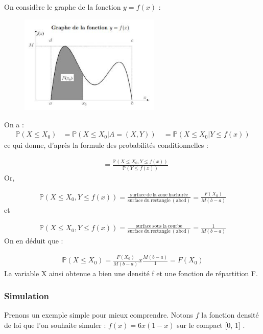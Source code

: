 \documentclass[10pt]{article} %
\begin{document}
On considère le graphe de la fonction $y = f(x)$ :

\begin{figure}[h!]
    \centering
    \includegraphics[width=0.6\textwidth]{media/Graphe_fonction.jpg}
\end{figure}

On a :
\begin{align}
\mathbb{P}(X \leq X_0) &= \mathbb{P}(X \leq  X_0 | A = (X, Y) ) \
&= \mathbb{P}(X \leq  X_0 | Y \leq f(x) )
\end{align}
ce qui donne, d'après la formule des probabilités conditionnelles :

\begin{align}
&= \frac{\mathbb{P}(X \leq  X_0, Y \leq f(x) )}{\mathbb{P}(Y \leq f(x))}
\end{align}
Or,

\begin{align}
\mathbb{P}(X \leq  X_0, Y \leq f(x) ) = \frac{\mathrm{surface\ de\ la\ zone\ hachurée}}{\mathrm{surface\ du\ rectangle\ (abcd)}} = \frac{F(X_0)}{M(b-a)}
\end{align}
et

\begin{align}
\mathbb{P}(X \leq  X_0, Y \leq f(x) ) = \frac{\mathrm{surface\ sous\ la\ courbe}}{\mathrm{surface\ du\ rectangle\ (abcd)}} = \frac{1}{M(b-a)}
\end{align}
On en déduit que :

\begin{align}
\mathbb{P}(X \leq X_0) = \frac{F(X_0)}{M(b-a)} x \frac{M(b-a)}{1}=F(X_0)
\end{align}
La variable X ainsi obtenue a bien une densité f et une fonction de
répartition F.

\subsubsection{Simulation}

Prenons un exemple simple pour mieux comprendre. Notons $f$ la fonction densité de loi que l'on souhaite simuler : $f(x) = 6x(1-x) $ sur le compact [0, 1] .
\end{document}

